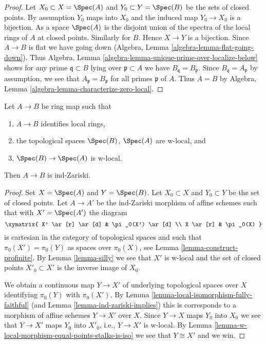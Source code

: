 \begin{proof}
Let $X_0 \subset X = \Spec(A)$ and $Y_0 \subset Y = \Spec(B)$ be the
sets of closed points. By assumption $Y_0$ maps into $X_0$ and
the induced map $Y_0 \to X_0$ is a bijection.
As a space $\Spec(A)$ is the disjoint union of the spectra
of the local rings of $A$ at closed points.
Similarly for $B$. Hence $X \to Y$ is a bijection.
Since $A \to B$ is flat we have going down
(Algebra, Lemma \ref{algebra-lemma-flat-going-down}).
Thus Algebra, Lemma \ref{algebra-lemma-unique-prime-over-localize-below}
shows for any prime $\mathfrak q \subset B$ lying over
$\mathfrak p \subset A$ we have $B_\mathfrak q = B_\mathfrak p$.
Since $B_\mathfrak q = A_\mathfrak p$ by assumption, we
see that $A_\mathfrak p = B_\mathfrak p$ for all primes $\mathfrak p$
of $A$. Thus $A = B$ by
Algebra, Lemma \ref{algebra-lemma-characterize-zero-local}.
\end{proof}

\begin{lemma}
\label{lemma-w-local-morphism-equal-stalks-is-ind-zariski}
Let $A \to B$ be ring map such that
\begin{enumerate}
\item $A \to B$ identifies local rings,
\item the topological spaces $\Spec(B)$, $\Spec(A)$ are w-local, and
\item $\Spec(B) \to \Spec(A)$ is w-local.
\end{enumerate}
Then $A \to B$ is ind-Zariski.
\end{lemma}

\begin{proof}
Set $X = \Spec(A)$ and $Y = \Spec(B)$. Let $X_0 \subset X$ and
$Y_0 \subset Y$ be the set of closed points. Let $A \to A'$ be the ind-Zariski
morphism of affine schemes such that with $X' = \Spec(A')$ the diagram
$$
\xymatrix{
X' \ar[r] \ar[d] & \pi_0(X') \ar[d] \\
X \ar[r] & \pi_0(X)
}
$$
is cartesian in the category of topological spaces and such that
$\pi_0(X') = \pi_0(Y)$ as spaces over $\pi_0(X)$, see
Lemma \ref{lemma-construct-profinite}. By
Lemma \ref{lemma-silly} we see that $X'$ is w-local and
the set of closed points $X'_0 \subset X'$ is the inverse image of $X_0$.

\medskip\noindent
We obtain a continuous map $Y \to X'$ of underlying topological spaces
over $X$ identifying $\pi_0(Y)$ with $\pi_0(X')$. By
Lemma \ref{lemma-local-isomorphism-fully-faithful}
(and Lemma \ref{lemma-ind-zariski-implies})
this is corresponds to a morphism of affine schemes $Y \to X'$
over $X$. Since $Y \to X$ maps $Y_0$ into $X_0$ we see that
$Y \to X'$ maps $Y_0$ into $X'_0$, i.e., $Y \to X'$ is w-local.
By Lemma \ref{lemma-w-local-morphism-equal-points-stalks-is-iso}
we see that $Y \cong X'$ and we win.
\end{proof}

